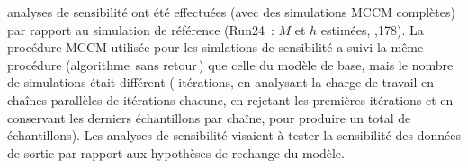 \documentclass[11pt]{book}
\newcommand{\angL}{\guillemotleft\,}
\newcommand{\angR}{\,\guillemotright}
\begin{document}
 analyses de sensibilit\'{e} ont \'{e}t\'{e} effectu\'{e}es (avec des simulations MCCM compl\`{e}tes) par rapport au simulation de r\'{e}f\'{e}rence (Run24~: $M$ et $h$ estim\'{e}es, ,178).
La proc\'{e}dure MCCM utilis\'{e}e pour les simlations de sensibilit\'{e} a suivi la m\^{e}me proc\'{e}dure (algorithme \angL{}sans retour\angR{}) que celle du mod\`{e}le de base, mais le nombre de simulations \'{e}tait diff\'{e}rent (\nSimsSens{} it\'{e}rations, en analysant la charge de travail en \nChains{} cha\^{i}nes parall\`{e}les de \cSimsSens{} it\'{e}rations chacune, en rejetant les \cBurnSens{} premi\`{e}res it\'{e}rations et en conservant les \cSamps{} derniers \'{e}chantillons par cha\^{i}ne, pour produire un total de \Nmcmc{} \'{e}chantillons).
Les analyses de sensibilit\'{e} visaient \`{a} tester la sensibilit\'{e} des donn\'{e}es de sortie par rapport aux hypoth\`{e}ses de rechange du mod\`{e}le.
\end{document}
